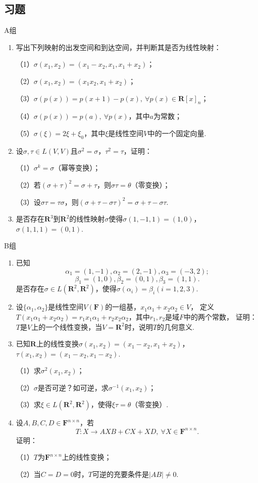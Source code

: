 \subsection{习题}
\centerline{\heiti A组}
\begin{enumerate}
	\item 写出下列映射的出发空间和到达空间，并判断其是否为线性映射：
	
	（1）$\sigma(x_1,x_2)=(x_1-x_2,x_1,x_1+x_2)$；

	（2）$\sigma(x_1,x_2)=(x_1x_2,x_1+x_2)$；

	（3）$\sigma(p(x))=p(x+1)-p(x),\ \forall p(x) \in \mathbf{R}[x]_n$；

	（4）$\sigma(p(x))=p(a),\ \forall p(x)$，其中$a$为常数；

	（5）$\sigma(\xi)=2\xi+\xi_0$，其中$\xi$是线性空间$V$中的一个固定向量.
	\item 设$\sigma,\tau \in L(V,V)$且$\sigma^2=\sigma$，$\tau^2=\tau$，证明：
	
	（1）$\sigma^k=\sigma$（幂等变换）；

	（2）若$(\sigma+\tau)^2=\sigma+\tau$，则$\sigma\tau=\theta$（零变换）；

	（3）设$\sigma\tau=\tau\sigma$，则$(\sigma+\tau-\sigma\tau)^2=\sigma+\tau-\sigma\tau$.
	\item 是否存在$\mathbf{R}^3$到$\mathbf{R}^2$的线性映射$\sigma$使得$\sigma(1,-1,1)=(1,0)$，
	$\sigma(1,1,1)=(0,1)$.
\end{enumerate}
\centerline{\heiti B组}
\begin{enumerate}
	\item 已知
	$$\alpha_1=(1,-1),\alpha_2=(2,-1),\alpha_3=(-3,2);$$
	$$\beta_1=(1,0),\beta_2=(0,1),\beta_3=(1,1).$$
	是否存在$\sigma\in L(\mathbf{R}^2,\mathbf{R}^2)$，使得$\sigma(\alpha_i)=\beta_i(i=1,2,3)$.
	\item 设$\{\alpha_1,\alpha_2\}$是线性空间$V(\mathbf{F})$的一组基，$x_1\alpha_1+x_2\alpha_2 \in V$，
	定义$T(x_1\alpha_1+x_2\alpha_2)=r_1x_1\alpha_1+r_2x_2\alpha_2$，其中$r_1,r_2$是域$F$中的两个常数，
	证明：$T$是$V$上的一个线性变换，当$V=\mathbf{R}^2$时，说明$T$的几何意义.
	\item 已知$\mathbf{R}$上的线性变换$\sigma(x_1,x_2)=(x_1-x_2,x_1+x_2)$，$\tau(x_1,x_2)=(x_1-x_2,x_1-x_2)$.
	
	（1）求$\sigma^2(x_1,x_2)$；

	（2）$\sigma$是否可逆？如可逆，求$\sigma^{-1}(x_1,x_2)$；

	（3）求$\xi\in L(\mathbf{R}^2,\mathbf{R}^2)$，使得$\xi\tau=\theta$（零变换）.
	\item 设$A,B,C,D \in \mathbf{F}^{n \times n}$，若
	$$T:X \to AXB+CX+XD,\ \forall X \in \mathbf{F}^{n \times n}.$$
	证明：

	（1）$T$为$\mathbf{F}^{n \times n}$上的线性变换；

	（2）当$C=D=0$时，$T$可逆的充要条件是$|AB| \neq 0$.
\end{enumerate}

